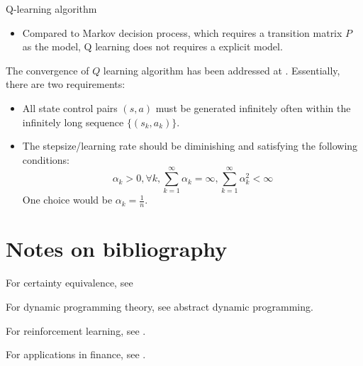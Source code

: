 \begin{refsection}
\begin{algorithm}[H]
	
	\caption{Q-learning algorithm}
\end{algorithm}

\begin{remark}\hfill
	\begin{itemize}
		\item Compared to Markov decision process, which requires a transition matrix $P$ as the model, Q learning does not requires a explicit model.
	\end{itemize}
\end{remark}


\begin{remark}
	The convergence of $Q$ learning algorithm has been addressed at \cite[495]{bertsekas2012dynamic2}. Essentially, there are two requirements:
	\begin{itemize}
		\item All state control pairs $(s,a)$ must be generated infinitely often within the infinitely long sequence $\{(s_k,a_k)\}$.
		\item The stepsize/learning rate should be diminishing and satisfying the following conditions:
		$$\alpha_k > 0, \forall k, \sum_{k=1}^\infty \alpha_k = \infty, \sum_{k=1}^\infty \alpha_k^2 < \infty$$
		One choice would be $\alpha_k = \frac{1}{n}$.
	\end{itemize}
\end{remark}

\section{Notes on bibliography}


For certainty equivalence, see \cite[160]{bertsekas2012dynamic}

For dynamic programming theory, see abstract dynamic programming.

For reinforcement learning, see \cite{wiering2012reinforcement}.

For applications in finance, see \cite{chang2004stochastic}\cite{pham2009continuous}\cite{bertsekas2012dynamic}.


\printbibliography
\end{refsection}
